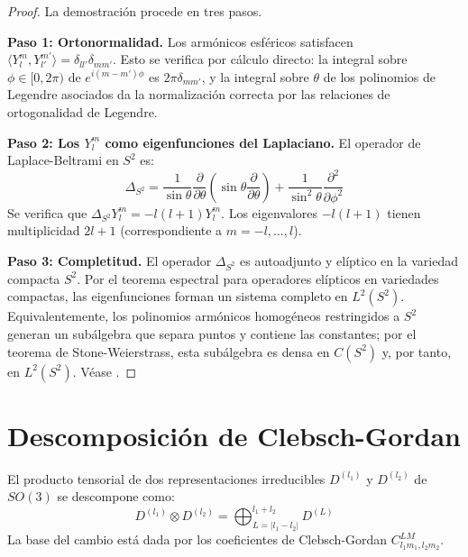 \begin{proof}
La demostración procede en tres pasos.

\textbf{Paso 1: Ortonormalidad.} Los armónicos esféricos satisfacen $\langle Y_l^m, Y_{l'}^{m'} \rangle = \delta_{ll'} \delta_{mm'}$. Esto se verifica por cálculo directo: la integral sobre $\phi \in [0, 2\pi)$ de $e^{i(m-m')\phi}$ es $2\pi \delta_{mm'}$, y la integral sobre $\theta$ de los polinomios de Legendre asociados da la normalización correcta por las relaciones de ortogonalidad de Legendre.

\textbf{Paso 2: Los $Y_l^m$ como eigenfunciones del Laplaciano.} El operador de Laplace-Beltrami en $S^2$ es:
\[
\Delta_{S^2} = \frac{1}{\sin\theta}\frac{\partial}{\partial\theta}\left(\sin\theta\frac{\partial}{\partial\theta}\right) + \frac{1}{\sin^2\theta}\frac{\partial^2}{\partial\phi^2}
\]
Se verifica que $\Delta_{S^2} Y_l^m = -l(l+1) Y_l^m$. Los eigenvalores $-l(l+1)$ tienen multiplicidad $2l+1$ (correspondiente a $m = -l, \ldots, l$).

\textbf{Paso 3: Completitud.} El operador $\Delta_{S^2}$ es autoadjunto y elíptico en la variedad compacta $S^2$. Por el teorema espectral para operadores elípticos en variedades compactas, las eigenfunciones forman un sistema completo en $L^2(S^2)$. Equivalentemente, los polinomios armónicos homogéneos restringidos a $S^2$ generan un subálgebra que separa puntos y contiene las constantes; por el teorema de Stone-Weierstrass, esta subálgebra es densa en $C(S^2)$ y, por tanto, en $L^2(S^2)$. Véase \citep[Capítulo~IV]{Folland1999}.
\end{proof}

\section{Descomposición de Clebsch-Gordan}\label{sec:clebsch_gordan}

\begin{theorem}\label{thm:clebsch_gordan_apendice}
El producto tensorial de dos representaciones irreducibles $D^{(l_1)}$ y $D^{(l_2)}$ de $SO(3)$ se descompone como:
\[
D^{(l_1)} \otimes D^{(l_2)} = \bigoplus_{L=|l_1-l_2|}^{l_1+l_2} D^{(L)}
\]
La base del cambio está dada por los coeficientes de Clebsch-Gordan $C_{l_1 m_1, l_2 m_2}^{L M}$.
\end{theorem}

